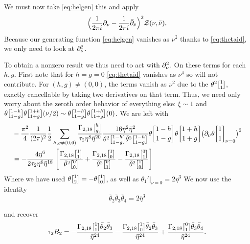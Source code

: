 \documentclass[11pt, class=article, crop=false]{standalone}
\begin{document}
\begin{enumerate}
	We must now take \eqref{eq:helgen} this and apply
	\[
		\Big(\frac{1}{2\pi i} \partial_\nu - \frac{1}{2\pi i} \bar {\partial}_{\bar \nu}\Big)^2  \mathcal Z(\nu, \bar \nu).
	\]
	Because our generating function \eqref{eq:helgen} vanishes as $\nu^2$ thanks to \eqref{eq:thetaid}, we only need to look at $\partial_\nu^2$.
	
	To obtain a nonzero result we thus need to act with $\partial_\nu^2$. On these terms for each $h,g$. First note that for $h=g=0$ \eqref{eq:thetaid} vanishes as $\nu^4$ so will not contribute. For $(h,g) \neq (0,0)$, the terms vanish as $\nu^2$ due to the $\theta^2 \twist11$, exactly cancellable by taking two derivatives on that term. Thus, we need only worry about the zeroth order behavior of everything else: $\xi \sim 1$ and $\theta\twist{1-h}{1-g} \theta \twist{1+h}{1+g} (\nu/2) \sim \theta\twist{1-h}{1-g} \theta \twist{1+h}{1+g} (0)$. We are left with 
	\[
	\begin{aligned}
		&-\frac{\pi^2}{4} \frac{1}{(2 \pi)^2} \frac12 \sum_{h,g \neq (0,0)} \frac{\Gamma_{2,18} \twist hg}{\tau_2 \eta^{8} \bar \eta^{20}} \frac{ 16 \eta^2 \bar \eta^2}{\theta^2 \twist{1-h}{1-g} \bar \theta^2 \twist{1-h}{1-g}} \theta\twist{1-h}{1-g} \theta \twist{1+h}{1+g} \big(\d_\nu \theta \twist11_{\nu = 0}\big)^2\\
		&= -\frac{4 \eta^6}{2 \tau_2 \eta^6 \bar \eta^{18}} \left[\frac{\Gamma_{2,18} \twist11 }{\bar \theta^2 \twist00} + \frac{\Gamma_{2,18} \twist10 }{\bar \theta^2 \twist01} -
		\frac{\Gamma_{2,18} \twist01 }{\bar \theta^2 \twist10} \right]
	\end{aligned}
	\]
	Where we have used $\theta \twist 12 = - \theta \twist10$, as well as $\theta_1'|_{\nu = 0} = 2 \eta^3$ 
	We now use the identity
	\[
		\bar \theta_2 \bar \theta_3 \bar \theta_4 = 2 \bar \eta^3
	\]
	
	and recover
	\[
		\tau_2 B_2 = - \frac{\Gamma_{2,18} \twist11 \bar \theta_2 \bar \theta_3}{\bar \eta^{24}} - \frac{ \Gamma_{2,18} \twist 10 \bar \theta_2 \bar \theta_3}{\bar \eta^{24}} +\frac{ \Gamma_{2,18} \twist 01 \bar \theta_3 \bar \theta_4}{\bar \eta^{24}}.
	\]
	

\end{enumerate}
\end{document}
